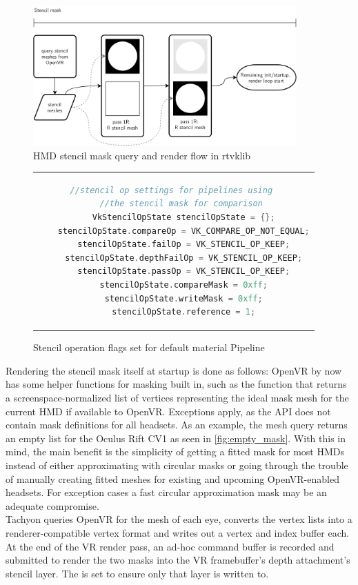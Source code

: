 \begin{figure}[htb]
  \centering
  \includegraphics[width=0.9\textwidth]{pictures/StencilMask}
  \caption{HMD stencil mask query and render flow in \gls{rtvklib}} \label{fig:StencilMask}
\end{figure}

\begin{figure}[htb]
  \centering
  \begin{tabular}{c}
  \begin{lstlisting}[language=C++]
	//stencil op settings for pipelines using 
	//the stencil mask for comparison 
	VkStencilOpState stencilOpState = {};
	stencilOpState.compareOp = VK_COMPARE_OP_NOT_EQUAL;
	stencilOpState.failOp = VK_STENCIL_OP_KEEP;
	stencilOpState.depthFailOp = VK_STENCIL_OP_KEEP;
	stencilOpState.passOp = VK_STENCIL_OP_KEEP;
	stencilOpState.compareMask = 0xff;
	stencilOpState.writeMask = 0xff;
	stencilOpState.reference = 1;
	\end{lstlisting}
  \end{tabular}
  \caption[Material pipeline stencil operation flags]{Stencil operation flags set for default material Pipeline}\label{fig:lst_StencilOpState_MaterialPipeline}
\end{figure}

Rendering the stencil mask itself at startup is done as follows: 
OpenVR by now has some helper functions for masking built in, such as the  function that returns a screenspace-normalized list of vertices representing the ideal mask mesh for the current HMD if available to OpenVR. Exceptions apply, as the API does not contain mask definitions for all headsets. As an example, the mesh query returns an empty list for the Oculus Rift CV1 as seen in \autoref{fig:empty_mask}. With this in mind, the main benefit is the simplicity of getting a fitted mask for most HMDs instead of either approximating with circular masks or going through the trouble of manually creating fitted meshes for existing and upcoming OpenVR-enabled headsets. For exception cases a fast circular approximation mask may be an adequate compromise. \\
\gls{Tachyon} queries OpenVR for the mesh of each eye, converts the vertex lists into a renderer-compatible vertex format and writes out a vertex and index buffer each. 
At the end of the \gls{VR} render pass, an ad-hoc command buffer is recorded and submitted to render the two masks into the \gls{VR} framebuffer's depth attachment's stencil layer. The  is set to ensure only that layer is written to. 

